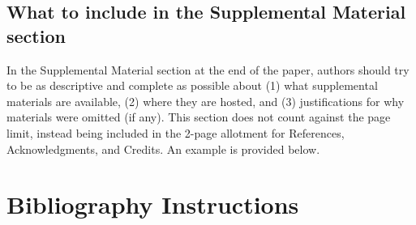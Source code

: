 \documentclass[journal]{vgtc}                %
\begin{document}
\subsection{What to include in the Supplemental Material section}

In the Supplemental Material section at the end of the paper, authors should try to be as descriptive and complete as possible about (1) what supplemental materials are available, (2) where they are hosted, and (3) justifications for why materials were omitted (if any).
This section does not count against the page limit, instead being included in the 2-page allotment for References, Acknowledgments, and Credits.
An example is provided below.

\section{Bibliography Instructions}
\end{document}
